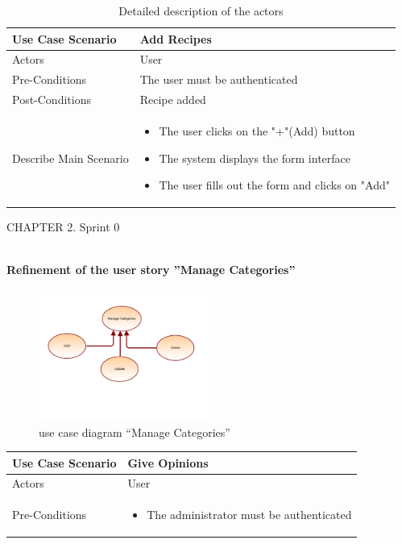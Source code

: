 \documentclass{article}
\begin{document}
{{\begin{table}[h]
    \centering
    \begin{tabularx}{\textwidth}{X|X}
        \toprule
        Use Case Scenario & Add Recipes \\
        \midrule
        Actors & User \\
        \midrule
        Pre-Conditions & The user must be authenticated \\
        \midrule
        Post-Conditions & Recipe added  \\
        \midrule
        Describe Main Scenario &  \begin{itemize}[label=$\bullet$]
            \item The user clicks on the "+"(Add) button
            \item The system displays the form interface
            \item The user fills out the form and clicks on "Add"
        \end{itemize} \\
        \bottomrule
    \end{tabularx}
    \caption{Detailed description of the actors}
    \label{tab:actors_roles}
\end{table}

\newpage
\noindent
CHAPTER 2.  Sprint 0 \\
\underline{\hspace{\textwidth}} \vspace{0.2cm}\\
{\large \textbf{Refinement of the user story ”Manage Categories”}
\begin{figure}[htbp]
    \centering
    \includegraphics[width=0.5\textwidth]{Manage}
    \caption{use case diagram “Manage Categories”}
    \label{fig:design2}
\end{figure}
\begin{table}[h]
    \centering
    \begin{tabularx}{\textwidth}{X|X}
        \toprule
        Use Case Scenario & Give Opinions \\
        \midrule
        Actors & User \\
        \midrule
        Pre-Conditions & \begin{itemize}[label=$\bullet$]
            \item The administrator must be authenticated
           

\end{itemize}
\end{tabularx}
\end{table}}}}
\end{document}
